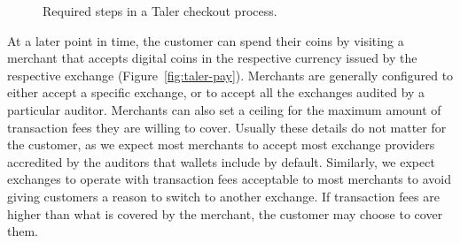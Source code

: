 \documentclass{llncs}
\begin{document}
\begin{figure}[t!]
   \hfill
{} \hfill
{}
\caption{Required steps in a Taler checkout process.}
\label{fig:shopping}
\end{figure}


At a later point in time, the customer can spend their coins by
visiting a merchant that accepts digital coins in the respective
currency issued by the respective exchange
(Figure~\ref{fig:taler-pay}).  Merchants are generally configured to
either accept a specific exchange, or to accept all the exchanges
audited by a particular auditor.  Merchants can also set a ceiling for
the maximum amount of transaction fees they are willing to cover.
Usually these details do not matter for the customer, as we expect
most merchants to accept most exchange providers accredited by the
auditors that wallets include by default.  Similarly, we expect
exchanges to operate with transaction fees acceptable to most
merchants to avoid giving customers a reason to switch to another
exchange.  If transaction fees are higher than what is covered by the
merchant, the customer may choose to cover them.
\end{document}
